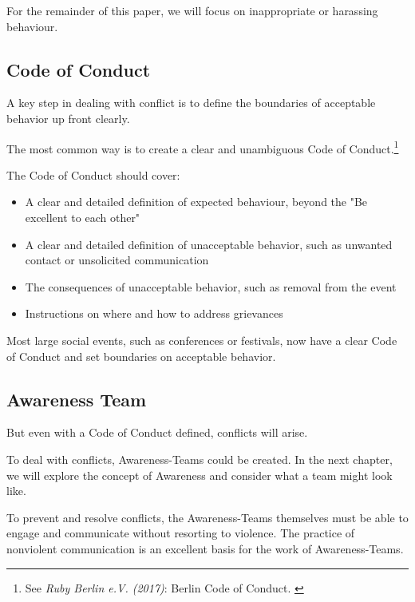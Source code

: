 For the remainder of this paper, we will focus on inappropriate or harassing behaviour.

\subsection{Code of Conduct}

A key step in dealing with conflict is to define the boundaries of acceptable behavior up front clearly.

The most common way is to create a clear and unambiguous Code of Conduct.\footnote{See \textit{Ruby Berlin e.V. (2017)}: Berlin Code of Conduct. \cite{coc}}

The Code of Conduct should cover:

\begin{itemize}
    \item A clear and detailed definition of expected behaviour, beyond the "Be excellent to each other"
    \item A clear and detailed definition of unacceptable behavior, such as unwanted contact or unsolicited communication
    \item The consequences of unacceptable behavior, such as removal from the event
    \item Instructions on where and how to address grievances
\end{itemize}

Most large social events, such as conferences or festivals, now have a clear Code of Conduct and set boundaries on acceptable behavior.

\subsection{Awareness Team}

But even with a Code of Conduct defined, conflicts will arise.

To deal with conflicts, Awareness-Teams could be created. In the next chapter, we will explore the concept of Awareness and consider what a team might look like.

To prevent and resolve conflicts, the Awareness-Teams themselves must be able to engage and communicate without resorting to violence. The practice of nonviolent communication is an excellent basis for the work of Awareness-Teams.
